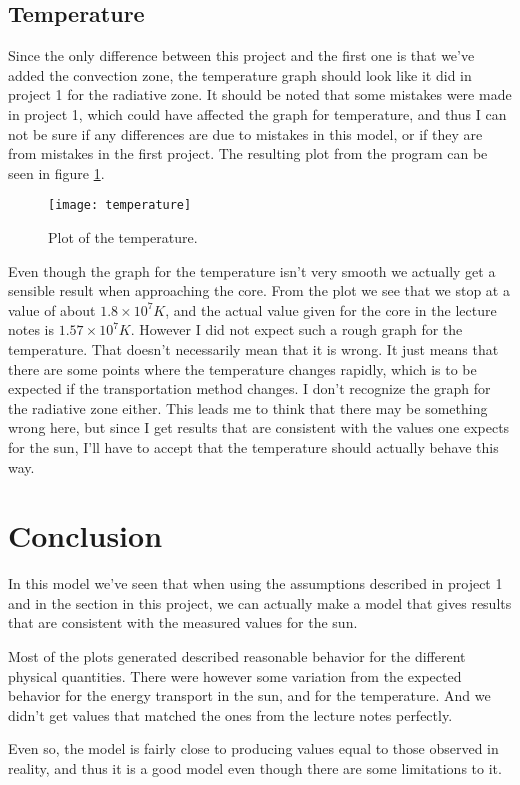 \documentclass[a4paper,12pt]{article}
\begin{document}
\subsection{Temperature}
Since the only difference between this project and the first one is that we've added the convection zone, the temperature graph should look like it did in project 1 for the radiative zone. It should be noted that some mistakes were made in project 1, which could have affected the graph for temperature, and thus I can not be sure if any differences are due to mistakes in this model, or if they are from mistakes in the first project. 
The resulting plot from the program can be seen in figure \ref{fig:Temperature}.
\begin{figure}[H]
	\texttt{[image: temperature]}
	\caption{Plot of the temperature.}
	\label{fig:Temperature}
\end{figure}
Even though the graph for the temperature isn't very smooth we actually get a sensible result when approaching the core. From the plot we see that we stop at a value of about $1.8\times10^7 K$, and the actual value given for the core in the lecture notes is $1.57\times10^7 K$. However I did not expect such a rough graph for the temperature. That doesn't necessarily mean that it is wrong. It just means that there are some points where the temperature changes rapidly, which is to be expected if the transportation method changes. I don't recognize the graph for the radiative zone either. This leads me to think that there may be something wrong here, but since I get results that are consistent with the values one expects for the sun, I'll have to accept that the temperature should actually behave this way. 

\section{Conclusion}
In this model we've seen that when using the assumptions described in project 1 and in the section in this project, we can actually make a model that gives results that are consistent with the measured values for the sun. 

Most of the plots generated described reasonable behavior for the different physical quantities. There were however some variation from the expected behavior for the energy transport in the sun, and for the temperature. And we didn't get values that matched the ones from the lecture notes perfectly.

Even so, the model is fairly close to producing values equal to those observed in reality, and thus it is a good model even though there are some limitations to it.
\end{document}
